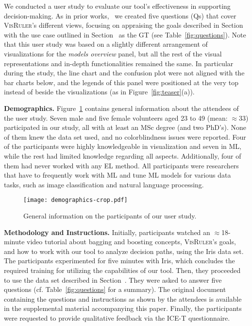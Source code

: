 We conducted a user study to evaluate our tool's effectiveness in supporting decision-making. %
As in prior works,~\cite{Ming2019RuleMatrix,Neto2021Explainable} we created five questions (Qs) %
%
that cover \textsc{VisRuler}'s different views,
focusing on appraising the goals described in Section~ with the use case outlined in Section~ as the GT (see Table~\ref{fig:questions}). Note that this user study was based on a slightly different arrangement of visualizations for the \emph{models overview} panel, but all the rest of the visual representations and in-depth functionalities remained the same. In particular during the study, the line chart and the confusion plot were not aligned with the bar charts below, and the legends of this panel were positioned at the very top instead of beside the visualizations (as in Figure~\ref{fig:teaser}(a)).

\textbf{Demographics.} Figure~\ref{fig:demographics} contains general information about the attendees of the user study. Seven male and five female volunteers aged 23 to 49 (mean: $\approx$33) participated in our study, all with at least an MSc degree (and two PhD's). None of them knew the data set used, and no colorblindness issues were reported. Four of the participants were highly knowledgeable in visualization and seven in ML, while the rest had limited knowledge regarding all aspects. Additionally, four of them had never worked with any EL method. All participants were researchers that have to frequently work with ML and tune ML models for various data tasks, such as image classification and natural language processing.

\begin{figure}[h]
  \centering
  \texttt{[image: demographics-crop.pdf]}
  \caption{General information on the participants of our user study.}
  \label{fig:demographics}
\end{figure}

\textbf{Methodology and Instructions.} Initially, participants watched an $\approx$18-minute video tutorial about bagging and boosting concepts, \textsc{VisRuler}'s goals, and how to work with our tool to analyze decision paths, using the Iris data set.~\cite{Fisher1936The} The participants experimented for five minutes with Iris, which concludes the required training for utilizing the capabilities of our tool. Then, they proceeded to use the data set described in Section~. They were asked to answer five questions (cf. Table~\ref{fig:questions} for a summary). The original document containing the questions and instructions as shown by the attendees is available in the supplemental material accompanying this paper. Finally, the participants were requested to provide qualitative feedback via the ICE-T questionnaire.~\cite{wall2019aheuristic}
%

